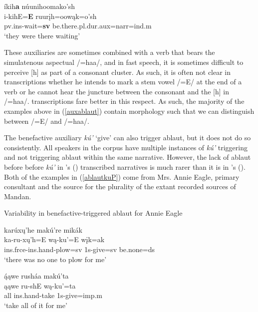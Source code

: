 \begin{exe}
\begin{xlist}
	\item\label{auxablaut7}
	\glll íkih\textbf{a} núunihoomako'sh\\
	i-kihE=\textbf{E} ruurįh=oowąk=o'sh\\
	pv.ins-\textnormal{wait}=\textbf{sv} \textnormal{be.there}.pl.dur.aux=narr=ind.m\\
	\glt `they were there waiting' \citep[258]{hollow1973b}

	\end{xlist}

\end{exe}

These auxiliaries are sometimes combined with a verb that bears the simulatenous aspectual /=haa/, and in fast speech, it is sometimes difficult to perceive [h] as part of a consonant cluster. As such, it is often not clear in  transcriptions whether he intends to mark a stem vowel /=E/ at the end of a verb or he cannot hear the juncture between the consonant and the [h] in /=haa/.  transcriptions fare better in this respect. As such, the majority of the examples above in (\ref{auxablaut}) contain morphology such that we can distinguish between /=E/ and /=haa/.

The benefactive auxiliary \textit{kú'} `give' can also trigger ablaut, but it does not do so consistently. All speakers in the corpus have multiple instances of \textit{kú'} triggering and not triggering ablaut within the same narrative. However, the lack of ablaut before before \textit{kú'} in \citeauthor{kennard1934}'s (\citeyear{kennard1934,kennard1936}) transcribed narratives is much rarer than it is in \citeauthor{hollow1970}'s (\citeyear{hollow1970,hollow1973a,hollow1973b}). Both of the examples in (\ref{ablautkuP}) come from Mrs. Annie Eagle,  primary consultant and the source for the plurality of the extant recorded sources of Mandan.

\begin{exe}
\item\label{ablautkuP} Variability in benefactive-triggered ablaut for Annie Eagle

	\begin{xlist}

	\item\label{ablautkuP1} \glll karúxų'he makú're mikák\\
	ka-ru-xų'h=E wą-ku'=E wįk=ak\\
	ins.frce-ins.hand-\textnormal{plow}=sv 1s-\textnormal{give}=sv \textnormal{be.none}=ds\\
	\glt `there was no one to plow for me' \citep[54]{hollow1973a}

	\item\label{ablautkuP2} \glll ą́ąwe rusháa makú'ta\\
	ąąwe ru-shE wą-ku'=ta\\
	\textnormal{all} ins.hand-\textnormal{take} 1s-\textnormal{give}=imp.m\\
	\glt `take all of it for me' \citep[78]{hollow1973a}

	\end{xlist}

\end{exe}


